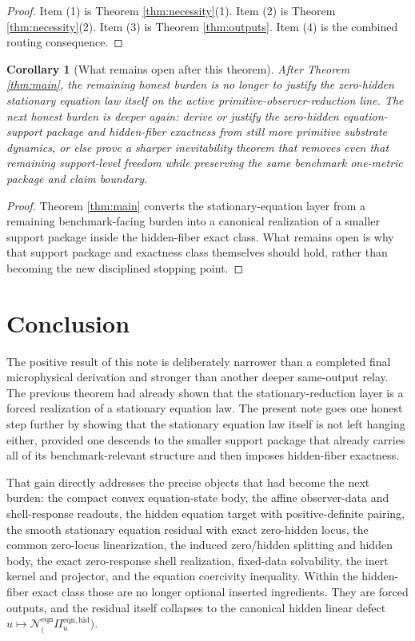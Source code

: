 \documentclass[11pt]{article}
\newcommand{\EqnProj}[1]{\Pi_{#1}^{\mathrm{eqn,hid}}}
\newcommand{\EqnLin}[1]{\mathcal N_{#1}^{\mathrm{eqn}}}
\newtheorem{corollary}{Corollary}
\begin{document}
\begin{proof}
Item (1) is Theorem \ref{thm:necessity}(1). Item (2) is Theorem \ref{thm:necessity}(2). Item (3) is Theorem \ref{thm:outputs}. Item (4) is the combined routing consequence.
\end{proof}

\begin{corollary}[What remains open after this theorem]
\label{cor:next}
After Theorem \ref{thm:main}, the remaining honest burden is no longer to justify the zero-hidden stationary equation law itself on the active primitive-observer-reduction line. The next honest burden is deeper again: derive or justify the zero-hidden equation-support package and hidden-fiber exactness from still more primitive substrate dynamics, or else prove a sharper inevitability theorem that removes even that remaining support-level freedom while preserving the same benchmark one-metric package and claim boundary.
\end{corollary}

\begin{proof}
Theorem \ref{thm:main} converts the stationary-equation layer from a remaining benchmark-facing burden into a canonical realization of a smaller support package inside the hidden-fiber exact class. What remains open is why that support package and exactness class themselves should hold, rather than becoming the new disciplined stopping point.
\end{proof}

\section{Conclusion}

The positive result of this note is deliberately narrower than a completed final microphysical derivation and stronger than another deeper same-output relay. The previous theorem had already shown that the stationary-reduction layer is a forced realization of a stationary equation law. The present note goes one honest step further by showing that the stationary equation law itself is not left hanging either, provided one descends to the smaller support package that already carries all of its benchmark-relevant structure and then imposes hidden-fiber exactness.

That gain directly addresses the precise objects that had become the next burden: the compact convex equation-state body, the affine observer-data and shell-response readouts, the hidden equation target with positive-definite pairing, the smooth stationary equation residual with exact zero-hidden locus, the common zero-locus linearization, the induced zero/hidden splitting and hidden body, the exact zero-response shell realization, fixed-data solvability, the inert kernel and projector, and the equation coercivity inequality. Within the hidden-fiber exact class those are no longer optional inserted ingredients. They are forced outputs, and the residual itself collapses to the canonical hidden linear defect \(u\mapsto \EqnLin(\EqnProj u)\).
\end{document}
